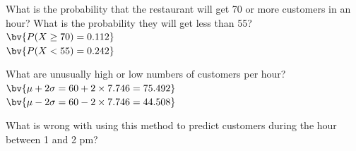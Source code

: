 \documentclass{article}
\begin{document}
\begin{flushleft}
\begin{enumalpha}
\item What is the probability that the restaurant will get 70 or more customers in an hour? What is the probability they will get less than 55? \\
\medskip
$\bv{P(X \ge 70) = 0.112}$\\
\medskip
$\bv{P(X < 55) = 0.242}$\\

\vspace{0.25in}

\item What are unusually high or low numbers of customers per hour?\\
\medskip
$\bv{\mu + 2 \sigma = 60 + 2 \times 7.746 = 75.492}$\\
$\bv{\mu - 2 \sigma = 60 - 2 \times 7.746 = 44.508}$\\
\medskip
{}

\vspace{0.25in}
\item What is wrong with using this method to predict customers during the hour between 1 and 2 pm?\\
\medskip
{}

\end{enumalpha}



\end{flushleft}
\end{document}
